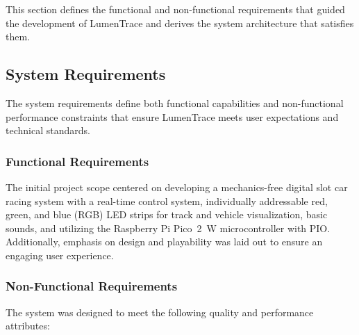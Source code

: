 \documentclass[10pt,journal,final,a4paper]{IEEEtran}
\begin{document}
This section defines the functional and non-functional requirements that guided the development of LumenTrace and derives the system architecture that satisfies them.

\subsection{System Requirements}
\label{subsec:system-requirements}

The system requirements define both functional capabilities and non-functional performance constraints that ensure LumenTrace meets user expectations and technical standards.

\subsubsection*{Functional Requirements}

The initial project scope centered on developing a mechanics-free digital slot car racing system with a real-time control system, individually addressable red, green, and blue (RGB) LED strips for track and vehicle visualization, basic sounds, and utilizing the Raspberry Pi Pico~2~W microcontroller with PIO. Additionally, emphasis on design and playability was laid out to ensure an engaging user experience.

\subsubsection*{Non-Functional Requirements}

The system was designed to meet the following quality and performance attributes:
\end{document}
